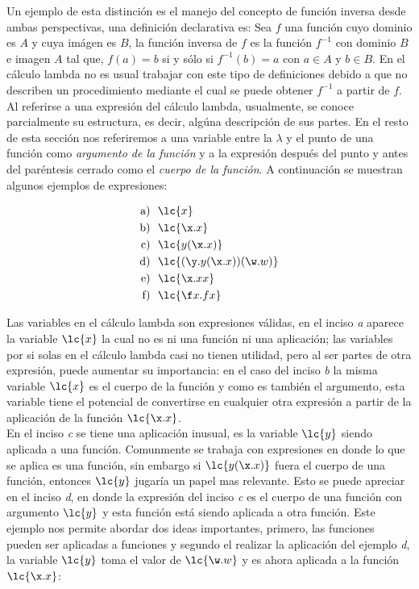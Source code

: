 Un ejemplo de esta distinción es el manejo del concepto de función
inversa desde ambas perspectivas, una definición declarativa es: Sea \(f\)
una función cuyo dominio es \(A\) y cuya imágen es \(B\), la función inversa de
\(f\) es la función \(f^{-1}\) con dominio \(B\) e imagen \(A\) tal que,
\(f(a)=b\) si y sólo si \(f^{-1}(b)=a\) con \(a\in A\) y \(b\in B\). En el
cálculo lambda no es usual trabajar con este tipo de definiciones debido a que
no describen un procedimiento mediante el cual se puede obtener \(f^{-1}\) a
partir de \(f\).\\

Al referirse a una expresión del cálculo lambda, usualmente, se conoce
parcialmente su estructura, es decir, algúna descripción de sus partes. En el
resto de esta sección nos referiremos a una variable entre la \(\lambda\) y el
punto de una función como \emph{argumento de la función} y a la expresión
después del punto y antes del paréntesis cerrado como el \emph{cuerpo de la
  función}. A continuación se muestran algunos ejemplos de expresiones:

\begin{align*}
  \text{a) }\ &\lc{x}\\
  \text{b) }\ &\lc{\x.x}\\
  \text{c) }\ &\lc{y (\x.x)}\\
  \text{d) }\ &\lc{(\y.y(\x.x))(\w.w)}\\
  \text{e) }\ &\lc{\x.x x}\\
  \text{f) }\ &\lc{\f x.f x}\\
\end{align*}

Las variables en el cálculo lambda son expresiones válidas, en el inciso
\emph{a} aparece la variable \(\lc{x}\) la cual no es ni una función ni una
aplicación; las variables por si solas en el cálculo lambda casi no tienen
utilidad, pero al ser partes de otra expresión, puede aumentar su importancia:
en el caso del inciso \emph{b} la misma variable \(\lc{x}\) es el cuerpo de la
función y como es también el argumento, esta variable tiene el potencial de
convertirse en cualquier otra expresión a partir de la aplicación de la función
\(\lc{\x.x}\).\\

En el inciso \emph{c} se tiene una aplicación inusual, es la variable \(\lc{y}\)
siendo aplicada a una función. Comunmente se trabaja con expresiones en donde lo
que se aplica es una función, sin embargo si \(\lc{y (\x.x)}\) fuera el 
cuerpo de una función, entonces \(\lc{y}\) jugaría un papel mas relevante. Esto
se puede apreciar en el inciso \emph{d}, en donde la expresión del inciso \emph{c}
es el cuerpo de una función con argumento \(\lc{y}\) y esta función está siendo
aplicada a otra función. Este ejemplo nos permite abordar dos ideas importantes,
primero, las funciones pueden ser aplicadas a funciones y segundo el realizar la
aplicación del ejemplo \emph{d}, la variable \(\lc{y}\) toma el valor de
\(\lc{\w.w}\) y es ahora aplicada a la función \(\lc{\x.x}\):

